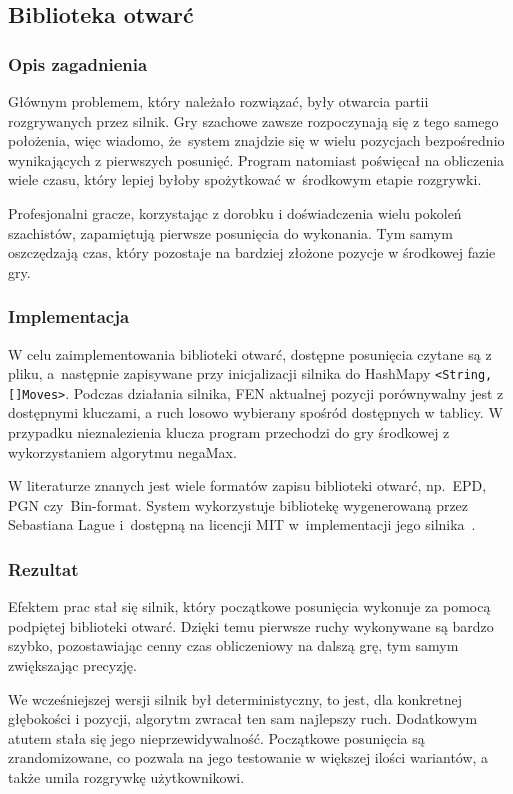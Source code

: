 \subsection{Biblioteka otwarć}
\label{subsec:biblioteka-otwarc}

\subsubsection{Opis zagadnienia}
Głównym problemem, który należało rozwiązać, były otwarcia partii rozgrywanych przez silnik.
Gry szachowe zawsze rozpoczynają się z tego samego położenia, więc wiadomo, że~system znajdzie się w wielu pozycjach bezpośrednio wynikających z pierwszych posunięć.
Program natomiast poświęcał na obliczenia wiele czasu, który lepiej byłoby spożytkować w~środkowym etapie rozgrywki.

Profesjonalni gracze, korzystając z dorobku i doświadczenia wielu pokoleń szachistów, zapamiętują pierwsze posunięcia do wykonania.
Tym samym oszczędzają czas, który pozostaje na bardziej złożone pozycje w środkowej fazie gry.

\subsubsection{Implementacja}
W celu zaimplementowania biblioteki otwarć, dostępne posunięcia czytane są z pliku, a~następnie zapisywane przy inicjalizacji silnika do HashMapy \texttt{<String, []Moves>}.
Podczas działania silnika, FEN aktualnej pozycji porównywalny jest z dostępnymi kluczami, a ruch losowo wybierany spośród dostępnych w tablicy.
W przypadku nieznalezienia klucza program przechodzi do gry środkowej z wykorzystaniem algorytmu negaMax.

W literaturze znanych jest wiele formatów zapisu biblioteki otwarć, np.\ EPD, PGN czy~Bin-format.
System wykorzystuje bibliotekę wygenerowaną przez Sebastiana Lague i~dostępną na licencji MIT w~implementacji jego silnika~\cite*{opening-library}.
\subsubsection{Rezultat}
Efektem prac stał się silnik, który początkowe posunięcia wykonuje za pomocą podpiętej biblioteki otwarć.
Dzięki temu pierwsze ruchy wykonywane są bardzo szybko, pozostawiając cenny czas obliczeniowy na dalszą grę, tym samym zwiększając precyzję.

We wcześniejszej wersji silnik był deterministyczny, to jest, dla konkretnej głębokości i pozycji, algorytm zwracał ten sam najlepszy ruch.
Dodatkowym atutem stała się jego nieprzewidywalność.
Początkowe posunięcia są zrandomizowane, co pozwala na jego testowanie w większej ilości wariantów, a także umila rozgrywkę użytkownikowi.
